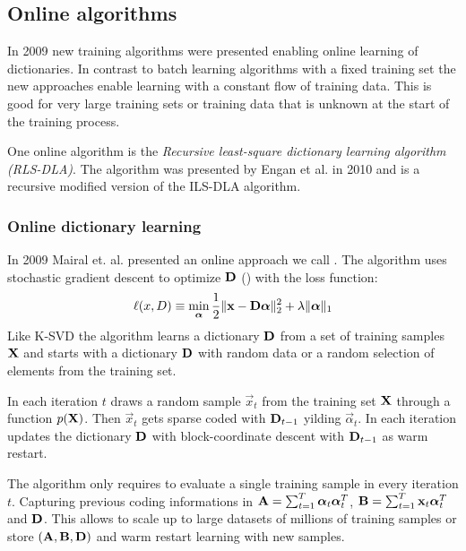 \subsection{Online algorithms}
In 2009 new training algorithms were presented enabling online learning of
dictionaries. In contrast to batch learning algorithms with a fixed training set
the new approaches enable learning with a constant flow of training data. This
is good for very large training sets or training data that is unknown at the
start of the training process.

One online algorithm is the \emph{Recursive least-square dictionary
learning algorithm (RLS-DLA)}. The algorithm was presented by Engan et al. in
2010\cite{Engan2010} and is a recursive modified version of the ILS-DLA
algorithm.

\subsubsection{Online dictionary learning}
\label{sec:mairal}
In 2009 Mairal et. al.\cite{Mairal2009} presented an online approach we call
\trainDL. The algorithm uses stochastic gradient descent to optimize
$\boldsymbol{\mathrm{D}}$ () with the loss function: 
\begin{equation*}
\ell(x,D) \equiv \min_{\boldsymbol{\mathrm{\alpha}}} \frac{1}{2}\lVert \boldsymbol{\mathrm{x}} -
\boldsymbol{\mathrm{D}}\boldsymbol{\mathrm{\alpha}} \rVert^{2}_{2}  +  \lambda \lVert
\boldsymbol{\mathrm{\alpha}}
\rVert_{1} 
\end{equation*} 
Like K-SVD the algorithm learns a dictionary $\boldsymbol{\mathrm{D}}$ from a set of
training samples $\boldsymbol{\mathrm{X}}$ and starts with a dictionary $\boldsymbol{\mathrm{D}}$ with random
data or a random selection of elements from the training set. 

In each iteration $t$  draws a random sample
$\vec{x}_t$ from the training set $\boldsymbol{\mathrm{X}}$ through a function
$p(\boldsymbol{\mathrm{X}})$.
Then $\vec{x}_t$ gets sparse coded with $\boldsymbol{\mathrm{D}}_{t-1}$ yilding
$\vec{\alpha}_t$. In each iteration  updates the
dictionary $\boldsymbol{\mathrm{D}}$ with block-coordinate descent with $\boldsymbol{\mathrm{D}}_{t-1}$ as warm
restart. 

The algorithm only requires to evaluate a single training sample in every
iteration $t$. Capturing previous coding informations in
$\boldsymbol{\mathrm{A}}=\sum_{t=1}^T\boldsymbol{\mathrm{\alpha}}_t\boldsymbol{\mathrm{\alpha}}_t^T$, 
$\boldsymbol{\mathrm{B}}=\sum_{t=1}^T\boldsymbol{\mathrm{x}}_t\boldsymbol{\mathrm{\alpha}}_t^T$ and $\boldsymbol{\mathrm{D}}$.
This allows to scale up to large datasets of millions of training
samples or store $(\boldsymbol{\mathrm{A}},\boldsymbol{\mathrm{B}},\boldsymbol{\mathrm{D}})$ and warm restart learning
with new samples.

